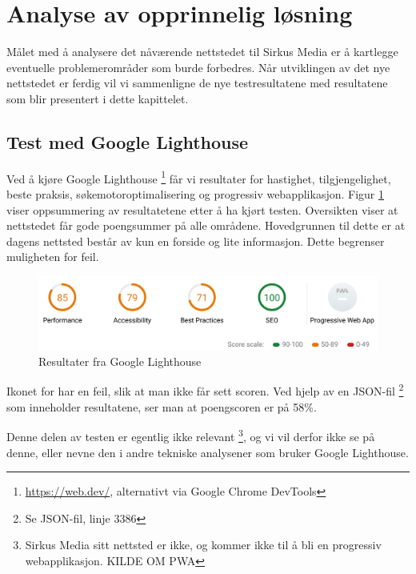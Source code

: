 \clearpage

\section{Analyse av opprinnelig løsning}

Målet med å analysere det nåværende nettstedet til Sirkus Media er å kartlegge eventuelle problemerområder som burde forbedres. Når utviklingen av det nye nettstedet er ferdig vil vi sammenligne de nye testresultatene med resultatene som blir presentert i dette kapittelet.


\subsection{Test med Google Lighthouse}
\label{sec:analysis-current-lighthouse}

Ved å kjøre Google Lighthouse \footnote{\url{https://web.dev/}, alternativt via Google Chrome DevTools} får vi resultater for hastighet, tilgjengelighet, beste praksis, søkemotoroptimalisering og progressiv webapplikasjon. Figur \ref{fig:analysis-current-lightouse-summary} viser oppsummering av resultatetene etter å ha kjørt testen. Oversikten viser at nettstedet får gode poengsummer på alle områdene. Hovedgrunnen til dette er at dagens nettsted består av kun en forside og lite informasjon. Dette begrenser muligheten for feil.

\begin{figure}[H]
    \centering
    \includegraphics[width=\textwidth]{bjornar/Lighthouse-Report-mobile.png}
    \caption{Resultater fra Google Lighthouse}
    \label{fig:analysis-current-lightouse-summary}
\end{figure}

Ikonet for  har en feil, slik at man ikke får sett scoren. Ved hjelp av en JSON-fil \footnote{Se JSON-fil, linje 3386} som inneholder resultatene, ser man at poengscoren er på 58\%.

Denne delen av testen er egentlig ikke relevant \footnote{Sirkus Media sitt nettsted er ikke, og kommer ikke til å bli en progressiv webapplikasjon. KILDE OM PWA}, og vi vil derfor ikke se på denne, eller nevne den i andre tekniske analysener som bruker Google Lighthouse.

